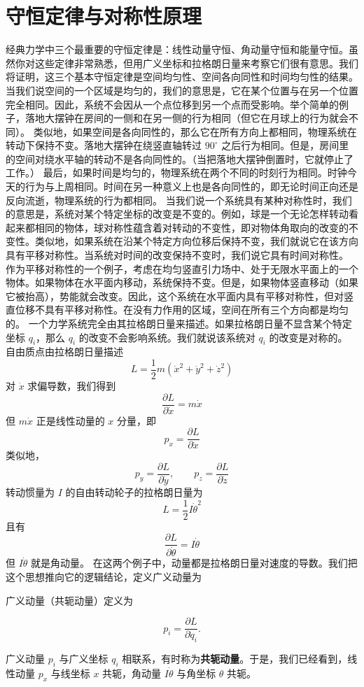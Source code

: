 \section{守恒定律与对称性原理}
经典力学中三个最重要的守恒定律是：线性动量守恒、角动量守恒和能量守恒。虽然你对这些定律非常熟悉，但用广义坐标和拉格朗日量来考察它们很有意思。我们将证明，这三个基本守恒定律是空间均匀性、空间各向同性和时间均匀性的结果。
当我们说空间的一个区域是均匀的，我们的意思是，它在某个位置与在另一个位置完全相同。因此，系统不会因从一个点位移到另一个点而受影响。举个简单的例子，落地大摆钟在房间的一侧和在另一侧的行为相同（但它在月球上的行为就会不同）。
类似地，如果空间是各向同性的，那么它在所有方向上都相同，物理系统在转动下保持不变。落地大摆钟在绕竖直轴转过 $90^\circ$ 之后行为相同。但是，房间里的空间对绕水平轴的转动不是各向同性的。（当把落地大摆钟倒置时，它就停止了工作。）
最后，如果时间是均匀的，物理系统在两个不同的时刻行为相同。时钟今天的行为与上周相同。时间在另一种意义上也是各向同性的，即无论时间正向还是反向流逝，物理系统的行为都相同。
当我们说一个系统具有某种对称性时，我们的意思是，系统对某个特定坐标的改变是不变的。例如，球是一个无论怎样转动看起来都相同的物体，球对称性蕴含着对转动的不变性，即对物体角取向的改变的不变性。类似地，如果系统在沿某个特定方向位移后保持不变，我们就说它在该方向具有平移对称性。当系统对时间的改变保持不变时，我们说它具有时间对称性。
作为平移对称性的一个例子，考虑在均匀竖直引力场中、处于无限水平面上的一个物体。如果物体在水平面内移动，系统保持不变。但是，如果物体竖直移动（如果它被抬高），势能就会改变。因此，这个系统在水平面内具有平移对称性，但对竖直位移不具有平移对称性。在没有力作用的区域，空间在所有三个方向都是均匀的。
一个力学系统完全由其拉格朗日量来描述。如果拉格朗日量不显含某个特定坐标 $q_i$，那么 $q_i$ 的改变不会影响系统。我们就说该系统对 $q_i$ 的改变是对称的。
自由质点由拉格朗日量描述
\[
L = \frac{1}{2}m(\dot{x}^2 + \dot{y}^2 + \dot{z}^2)
\]
对 $\dot{x}$ 求偏导数，我们得到
\[
\frac{\partial L}{\partial \dot{x}} = m\dot{x}
\]
但 $m\dot{x}$ 正是线性动量的 $x$ 分量，即
\[
p_x = \frac{\partial L}{\partial \dot{x}}
\]
类似地，
\[
p_y = \frac{\partial L}{\partial \dot{y}}, \qquad p_z = \frac{\partial L}{\partial \dot{z}}
\]
转动惯量为 $I$ 的自由转动轮子的拉格朗日量为
\[
L = \frac{1}{2}I\dot{\theta}^2
\]
且有
\[
\frac{\partial L}{\partial \dot{\theta}} = I\dot{\theta}
\]
但 $I\dot{\theta}$ 就是角动量。
在这两个例子中，动量都是拉格朗日量对速度的导数。我们把这个思想推向它的逻辑结论，定义广义动量为
\begin{definition}[广义动量]
广义动量（共轭动量）定义为

\[
p_i = \frac{\partial L}{\partial \dot{q}_i}.
\]

广义动量 $p_i$ 与广义坐标 $q_i$ 相联系，有时称为\textbf{共轭动量}。于是，我们已经看到，线性动量 $p_x$ 与线坐标 $x$ 共轭，角动量 $I\dot{\theta}$ 与角坐标 $\theta$ 共轭。
\end{definition}
